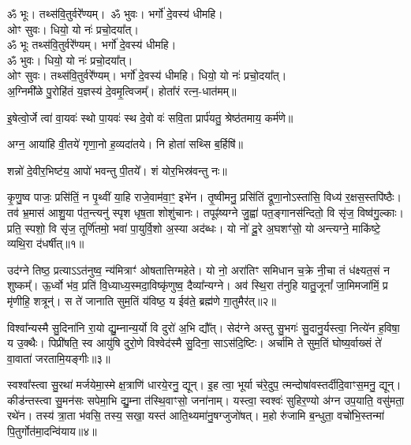
ॐ भूः। तथ्स॑वि॒तुर्वरे᳚ण्यम्।\
ॐ भुवः। भर्गो॑ दे॒वस्य॑ धीमहि।\\
ओꣳ सुवः। धियो॒ यो नः॑ प्रचो॒दया᳚त्।\\
ॐ भूः तथ्स॑वि॒तुर्वरे᳚ण्यम्। भर्गो॑ दे॒वस्य॑ धीमहि।\\
ॐ भुवः। धियो॒ यो नः॑ प्रचो॒दया᳚त्।\\
ओꣳ सुवः। तथ्स॑वि॒तुर्वरे᳚ण्यम्। भर्गो॑ दे॒वस्य॑ धीमहि। धियो॒ यो नः॑ प्रचो॒दया᳚त्।\\

अ॒ग्निमी᳚ळे पु॒रोहि॑तं य॒ज्ञस्य॑ दे॒वमृ॒त्विजम्᳚। होता᳚रं रत्न॒-धात॑मम्॥ 

इ॒षेत्वो॒र्जे त्वा॑ वा॒यवः॑ स्थो पा॒यवः॑ स्थ दे॒वो वः॑ सवि॒ता प्रार्प॑यतु॒ श्रेष्ठ॑तमाय॒ कर्म॑णे॥

अग्न॒ आया॑हि वी॒तये॑ गृणा॒नो ह॒व्यदा॑तये। नि होता॑ सथ्सि ब॒र्हिषि॑॥ 

शन्नो॑ दे॒वीर॒भिष्ट॑य॒ आपो॑ भवन्तु पी॒तये᳚। शं योर॒भिस्र॑वन्तु नः॥ 



कृ॒णु॒ष्व पाजः॒ प्रसि॑तिं॒ न पृ॒थ्वीं या॒हि राजे॒वाम॑वा॒ꣳ॒ इभे॑न। तृ॒ष्वीमनु॒ प्रसि॑तिं द्रूणा॒नोऽस्ता॑सि॒ विध्य॑ र॒क्षस॒स्तपि॑ष्ठैः। तव॑ भ्र॒मास॑ आशु॒या प॑त॒न्त्यनु॑ स्पृश धृष॒ता शोशु॑चानः। तपूꣴ॑ष्यग्ने जु॒ह्वा॑ पत॒ङ्गानस॑न्दितो॒ वि सृ॑ज॒ विष्व॑गु॒ल्काः। प्रति॒ स्पशो॒ वि सृ॑ज॒ तूर्णि॑तमो॒ भवा॑ पा॒युर्वि॒शो अ॒स्या अद॑ब्धः। यो नो॑ दू॒रे अ॒घशꣳ॑सो॒  यो अन्त्यग्ने॒ माकि॑ष्टे॒ व्यथि॒रा द॑धर्षीत्॥१॥

उद॑ग्ने तिष्ठ॒ प्रत्याऽऽत॑नुष्व॒ न्य॑मित्राꣳ॑ ओषतात्तिग्महेते। यो नो॒ अरा॑तिꣳ समिधान च॒क्रे नी॒चा तं ध॑क्ष्यत॒सं न शुष्कम्᳚। ऊ॒र्ध्वो भ॑व॒ प्रति॑ वि॒ध्याध्य॒स्मदा॒विष्कृ॑णुष्व॒ दैव्या᳚न्यग्ने। अव॑ स्थि॒रा त॑नुहि यातु॒जूनां᳚ जा॒मिमजा॑मिं॒ प्र मृ॑णीहि॒ शत्रून्॑। स ते॑ जानाति सुम॒तिं य॑विष्ठ॒ य ईव॑ते॒ ब्रह्म॑णे गा॒तुमैर॑त्॥२॥

 विश्वा᳚न्यस्मै सु॒दिना॑नि रा॒यो द्यु॒म्नान्य॒र्यो वि दुरो॑ अ॒भि द्यौ᳚त्। सेद॑ग्ने अस्तु सु॒भगः॑ सु॒दानु॒र्यस्त्वा॒ नित्ये॑न ह॒विषा॒ य उ॒क्थैः। पिप्री॑षति॒ स्व आयु॑षि दुरो॒णे विश्वेद॑स्मै सु॒दिना॒ साऽस॑दि॒ष्टिः। अर्चा॑मि ते सुम॒तिं घोष्य॒र्वाख्सं ते॑ वा॒वाता॑ जरतामि॒यङ्गीः॥३॥
 
स्वश्वा᳚स्त्वा सु॒रथा॑ मर्जयेमा॒स्मे क्ष॒त्राणि॑ धारये॒रनु॒ द्यून्। इ॒ह त्वा॒ भूर्या च॑रे॒दुप॒ त्मन्दोषा॑\-वस्तर्दीदि॒वाꣳ\-स॒मनु॒ द्यून्। कीड॑न्तस्त्वा सु॒मन॑सः सपेमा॒भि द्यु॒म्ना त॑स्थि॒वाꣳसो॒ जना॑नाम्। यस्त्वा॒ स्वश्वः॑ सुहिर॒ण्यो अ॑ग्न उप॒याति॒ वसु॑मता॒ रथे॑न। तस्य॑ त्रा॒ता भ॑वसि॒ तस्य॒ सखा॒ यस्त॑ आति॒थ्यमा॑नु॒षग्जुजो॑षत्। म॒हो रु॑जामि ब॒न्धुता॒ वचो॑भि॒स्तन्मा॑ पि॒तुर्गोत॑मा॒दन्वि॑याय॥४॥

